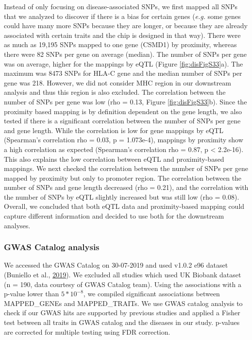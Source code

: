 \documentclass[12pt,twoside]{unicam}
\begin{document}
Instead of only focusing on disease-associated SNPs, we first mapped all SNPs that we analyzed to discover if there is a bias for certain genes (\emph{e.g.} some genes could have many more SNPs because they are longer, or because they are already associated with certain traits and the chip is designed in that way). There were as much as 19,195 SNPs mapped to one gene (CSMD1) by proximity, whereas there were 82 SNPs per gene on average (median). The number of SNPs per gene was on average, higher for the mappings by eQTL (Figure \ref{fig:disFigS33}a). The maximum was 8473 SNPs for HLA-C gene and the median number of SNPs per gene was 218. However, we did not consider MHC region in our downstream analysis and thus this region is also excluded. The correlation between the number of SNPs per gene was low (rho = 0.13, Figure \ref{fig:disFigS33}b). Since the proximity based mapping is by definition dependent on the gene length, we also tested if there is a significant correlation between the number of SNPs per gene and gene length. While the correlation is low for gene mappings by eQTL (Spearman's correlation rho = 0.03, p = 1.073e-4), mappings by proximity show a high correlation as expected (Spearman's correlation rho = 0.87, p \textless{} 2.2e-16). This also explains the low correlation between eQTL and proximity-based mappings. We next checked the correlation between the number of SNPs per gene mapped by proximity but only to promoter region. The correlation between the number of SNPs and gene length decreased (rho = 0.21), and the correlation with the number of SNPs by eQTL slightly increased but was still low (rho = 0.08). Overall, we concluded that both eQTL data and proximity-based mapping could capture different information and decided to use both for the downstream analyses.

\hypertarget{gwas-catalog-analysis}{%
\subsubsection{GWAS Catalog analysis}\label{gwas-catalog-analysis}}

We accessed the GWAS Catalog on 30-07-2019 and used v1.0.2 e96 dataset (Buniello et al., \protect\hyperlink{ref-Buniello2019}{2019}). We excluded all studies which used UK Biobank dataset (n = 190, data courtesy of GWAS Catalog team). Using the associations with a p-value lower than \(5*10^{-8}\), we compiled significant associations between MAPPED\_GENEs and MAPPED\_TRAITs. We use GWAS catalog analysis to check if our GWAS hits are supported by previous studies and applied a Fisher test between all traits in GWAS catalog and the diseases in our study. p-values are corrected for multiple testing using FDR correction.
\end{document}
